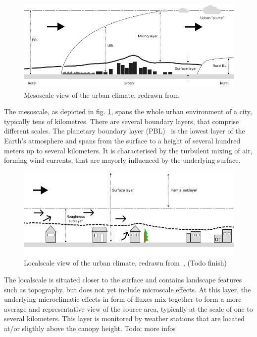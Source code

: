 \begin{figure}[h]
    \centering
    \includegraphics[width=\textwidth]{images/Mesoscale Boundary Layer.png}
    \caption{Mesoscale view of the urban climate, redrawn from~\cite{oke2006guideline}}
    \label{fig:mesoscale boundary layer}
\end{figure}

The mesoscale, as depicted in fig. \ref{fig:mesoscale boundary layer}, spans the whole urban environment of a city, typically tens of kilometres. There are several boundary layers, that comprise different scales. The planetary boundary layer (PBL)~\cite{wyngaard1985structure} is the lowest layer of the Earth's atmosphere and spans from the surface to a height of several hundred meters up to several kilometers. It is characterised by the turbulent mixing of air, forming wind currents, that are mayorly influenced by the underlying surface.

\begin{figure}[h]
    \centering
    \includegraphics[width=\textwidth]{images/Localscale Boundary Layer.png}
    \caption{Localscale view of the urban climate, redrawn from~\cite{oke2006guideline}, (Todo finish)}
    \label{fig:localscale boundary layer}
\end{figure}

The localscale is situated closer to the surface and contains landscape features such as topography, but does not yet include microscale effects. At this layer, the underlying microclimatic effects in form of fluxes mix together to form a more average and representative view of the source area, typically at the scale of one to several kilometers. This layer is monitored by weather stations that are located at/or sligthly above the canopy height.
Todo: more infos

